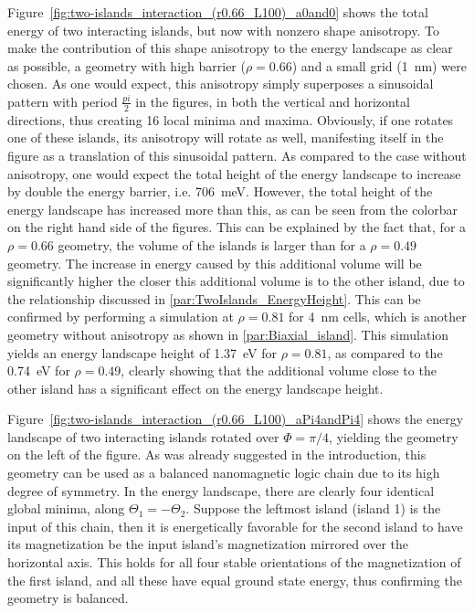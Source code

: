 \documentclass[11pt,a4paper,english]{article}
\begin{document}
Figure~\ref{fig:two-islands_interaction_(r0.66_L100)_a0and0} shows the total energy of two interacting islands, but now with nonzero shape anisotropy. To make the contribution of this shape anisotropy to the energy landscape as clear as possible, a geometry with high barrier ($\rho=0.66$) and a small grid (\SI{1}{\nano\metre}) were chosen. As one would expect, this anisotropy simply superposes a sinusoidal pattern with period $\frac{pi}{2}$ in the figures, in both the vertical and horizontal directions, thus creating 16 local minima and maxima. Obviously, if one rotates one of these islands, its anisotropy will rotate as well, manifesting itself in the figure as a translation of this sinusoidal pattern. As compared to the case without anisotropy, one would expect the total height of the energy landscape to increase by double the energy barrier, i.e. \SI{706}{\milli\electronvolt}. However, the total height of the energy landscape has increased more than this, as can be seen from the colorbar on the right hand side of the figures. This can be explained by the fact that, for a $\rho=0.66$ geometry, the volume of the islands is larger than for a $\rho=0.49$ geometry. The increase in energy caused by this additional volume will be significantly higher the closer this additional volume is to the other island, due to the relationship discussed in \cref{par:TwoIslands_EnergyHeight}. This can be confirmed by performing a simulation at $\rho=0.81$ for \SI{4}{\nano\metre} cells, which is another geometry without anisotropy as shown in \cref{par:Biaxial_island}. This simulation yields an energy landscape height of \SI{1.37}{\electronvolt} for $\rho=0.81$, as compared to the \SI{0.74}{\electronvolt} for $\rho=0.49$, clearly showing that the additional volume close to the other island has a significant effect on the energy landscape height. \par
Figure~\ref{fig:two-islands_interaction_(r0.66_L100)_aPi4andPi4} shows the energy landscape of two interacting islands rotated over $\Phi=\pi/4$, yielding the geometry on the left of the figure. As was already suggested in the introduction, this geometry can be used as a balanced nanomagnetic logic chain due to its high degree of symmetry. In the energy landscape, there are clearly four identical global minima, along $\Theta_1 = -\Theta_2$. Suppose the leftmost island (island 1) is the input of this chain, then it is energetically favorable for the second island to have its magnetization be the input island's magnetization mirrored over the horizontal axis. This holds for all four stable orientations of the magnetization of the first island, and all these have equal ground state energy, thus confirming the geometry is balanced.
\end{document}
